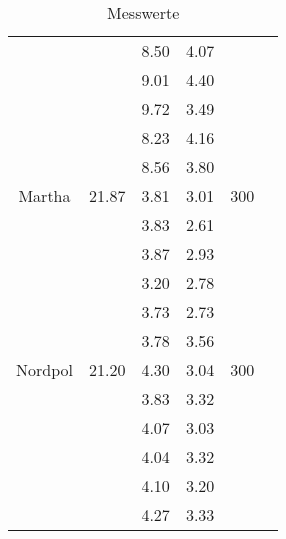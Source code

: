 \begin{table}
\begin{tabular}{cccccc}
	& & 8.50 & 4.07 & & \\
	& & 9.01 & 4.40 & & \\
	& & 9.72 & 3.49 & & \\
	& & 8.23 & 4.16 & & \\
	& & 8.56 & 3.80 & & \\
	\hline
	Martha & 21.87 & 3.81 & 3.01 & 300 & \\
	& & 3.83 & 2.61 & & \\
	& & 3.87 & 2.93 & & \\
	& & 3.20 & 2.78 & & \\
	& & 3.73 & 2.73 & & \\
	& & 3.78 & 3.56 & & \\
	\hline
	Nordpol & 21.20 & 4.30 & 3.04 & 300 & \\
	& & 3.83 & 3.32 & & \\
	& & 4.07 & 3.03 & & \\
	& & 4.04 & 3.32 & & \\
	& & 4.10 & 3.20 & & \\
	& & 4.27 & 3.33 & & \\
	\hline
\end{tabular}
\caption{Messwerte}
\label{tab:Messwerte}
\end{table}
